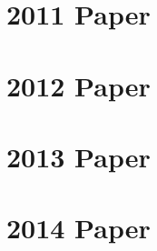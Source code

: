 \section*{2011 Paper}



\newpage

\section*{2012 Paper}



\newpage

\section*{2013 Paper}



\newpage

\section*{2014 Paper}


